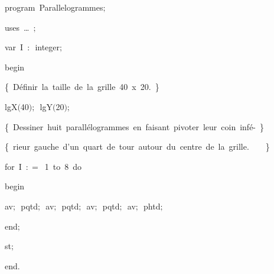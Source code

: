 
{
\parindent {}
\medskip

\carrenoir
\vspace{\neglskip}\mbox{\blc  \idt  \mcl program\idt \ Parallelogrammes$;$
}\par 
\vspace{\neglskip}\mbox{\blc \blk\idt \mcl uses\idt \ \ldots\ $;$
}\par 
\pagebreak[3] 
\vspace{\neglskip}\mbox{\blc  \blk\idt  \mcl var\idt \ I\ $:$\ integer$;$}\par 
\vspace{\neglskip}\mbox{\blc  \idt  \mcl begin\idt }\par 
\vspace{\neglskip}\mbox{\blc  \blk\idt  \cmt  \{\ Définir\ la\ taille\ de\ la\ grille\ 40\ x\ 20.\ \}\idt }\par 
\vspace{\neglskip}\mbox{\blc  \blk\idt  lgX$($40$)$$;$\ lgY$($20$)$$;$}\par 
\vspace{\neglskip}\mbox{\blc  \blk\idt  \cmt  \{\ Dessiner\ huit\ parallélogrammes\ en\ faisant\ pivoter\ leur\ coin\ infé-\ \}\idt }\par 
\vspace{\neglskip}\mbox{\blc  \blk\idt  \cmt  \{\ rieur\ gauche\ d{'}un\ quart\ de\ tour\ autour\ du\ centre\ de\ la\ grille.\ \ \ \ \}\idt }\par 
\pagebreak[3] 
\vspace{\neglskip}\mbox{\blc  \blk\idt  \mcl for\idt \ I\ $:$$=$\ 1\ \mcl to\idt \ 8\ \mcl do\idt }\par 
\vspace{\neglskip}\mbox{\blc  \blk\blk\idt  \mcl begin\idt }\par 
\vspace{\neglskip}\mbox{\blc  \blk\blk\blk\idt  av$;$\ pqtd$;$\ av$;$\ pqtd$;$\ av$;$\ pqtd$;$\ av$;$\ phtd$;$\ }\par 
\vspace{\neglskip}\mbox{\blc  \blk\blk\idt  \mcl end\idt $;$}\par 
\vspace{\neglskip}\mbox{\blc  \blk\idt  st$;$}\par 
\vspace{\neglskip}\mbox{\blc  \idt  \mcl end\idt $.$}\par 

\medskip }

